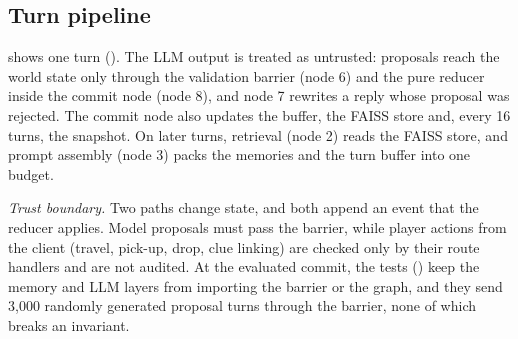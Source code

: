 \documentclass[letterpaper,journal]{IEEEtran}
\begin{document}
\subsection{Turn pipeline}\label{sec:system}
 shows one turn (). The LLM output is treated as untrusted: proposals reach the world state only through the validation barrier (node 6) and the pure reducer inside the commit node (node 8), and node 7 rewrites a reply whose proposal was rejected. The commit node also updates the buffer, the FAISS store and, every 16 turns, the snapshot. On later turns, retrieval (node 2) reads the FAISS store, and prompt assembly (node 3) packs the memories and the turn buffer into one budget.

\emph{Trust boundary.} Two paths change state, and both append an event that the reducer applies. Model proposals must pass the barrier, while player actions from the client (travel, pick-up, drop, clue linking) are checked only by their route handlers and are not audited. At the evaluated commit, the tests () keep the memory and LLM layers from importing the barrier or the graph, and they send 3{,}000 randomly generated proposal turns through the barrier, none of which breaks an invariant.
\end{document}
